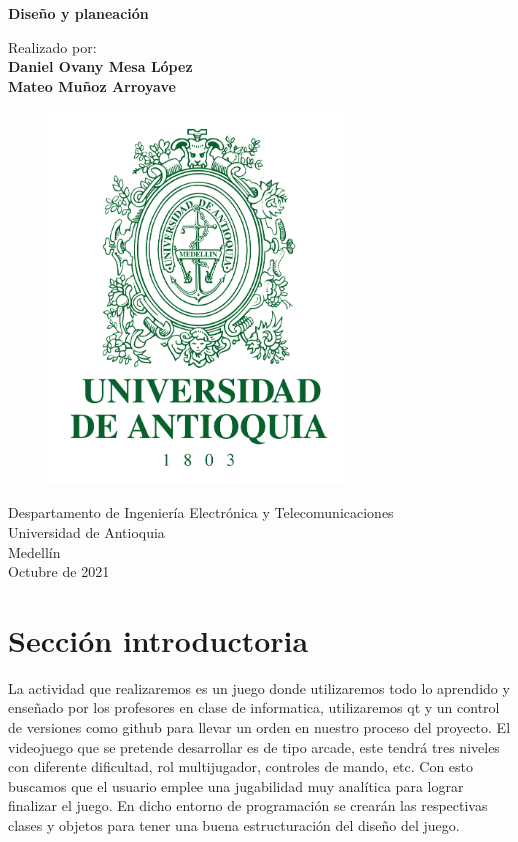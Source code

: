 \documentclass{article}
\begin{document}
\begin{titlepage}
    \begin{center}
            
        \Huge
        \textbf{Diseño y planeación}
        \LARGE
        \vspace{0.8cm}
        
        Realizado por:\\    
        \textbf{Daniel Ovany Mesa López}\\
        \textbf{Mateo Muñoz Arroyave}
        \vfill
        
        \begin{figure}[htp]
            \centering
            \includegraphics[width=8cm]{images/EscudoUdeA.png}
        \end{figure}
        
            
        \vspace{0.2cm}
            
        \Large
        Despartamento de Ingeniería Electrónica y Telecomunicaciones\\
        Universidad de Antioquia\\
        Medellín\\
        Octubre de 2021
            
    \end{center}
\end{titlepage}

\tableofcontents

\section{Sección introductoria}\label{intro}
La actividad que realizaremos es un juego donde utilizaremos todo lo aprendido y enseñado por los profesores en clase de informatica, utilizaremos qt y un control de versiones como github para llevar un orden en nuestro proceso del proyecto. El videojuego que se pretende desarrollar es de tipo arcade, este tendrá tres niveles con diferente dificultad, rol multijugador, controles de mando, etc. Con esto buscamos que el usuario emplee una jugabilidad muy analítica para lograr finalizar el juego. En dicho entorno de programación se crearán las respectivas clases y objetos para tener una buena estructuración del diseño del juego.
\end{document}
